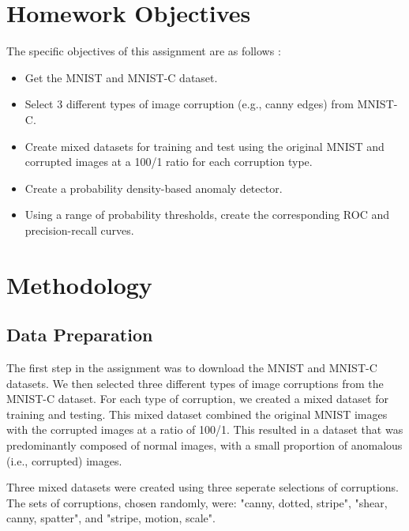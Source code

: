 \section{Homework Objectives}

The specific objectives of this assignment are as follows \cite{assignment6}:
\begin{itemize}
    \item Get the MNIST and MNIST-C dataset.
    \item Select 3 different types of image corruption (e.g., canny edges) from MNIST-C.
    \item Create mixed datasets for training and test using the original MNIST and corrupted images at a 100/1 ratio for each corruption type.
    \item Create a probability density-based anomaly detector.
    \item Using a range of probability thresholds, create the corresponding ROC and precision-recall curves.
\end{itemize}


\section{Methodology}
\subsection{Data Preparation}
The first step in the assignment was to download the MNIST and MNIST-C datasets. 
We then selected three different types of image corruptions from the MNIST-C dataset.
For each type of corruption, we created a mixed dataset for training and testing. 
This mixed dataset combined the original MNIST images with the corrupted images at a ratio of 100/1. 
This resulted in a dataset that was predominantly composed of normal images, with a small proportion of anomalous (i.e., corrupted) images.\par

Three mixed datasets were created using three seperate selections of corruptions.
The sets of corruptions, chosen randomly, were: "canny, dotted, stripe", "shear, canny, spatter", and "stripe, motion, scale".

